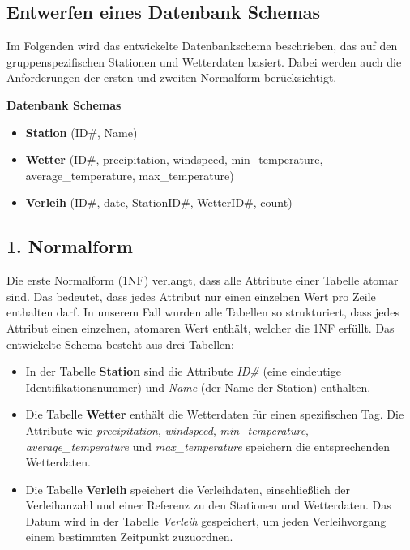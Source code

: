 \documentclass{article}
\begin{document}
\subsection{Entwerfen eines Datenbank Schemas}

Im Folgenden wird das entwickelte Datenbankschema beschrieben, das auf den gruppenspezifischen Stationen und Wetterdaten basiert. Dabei werden auch die Anforderungen der ersten und zweiten Normalform berücksichtigt.

\textbf{Datenbank Schemas}

\begin{itemize}
  \item \textbf{Station} (ID\#, Name)
  \item \textbf{Wetter} (ID\#, precipitation, windspeed, min\_temperature, average\_temperature, max\_temperature)
  \item \textbf{Verleih} (ID\#, date, StationID\#, WetterID\#, count)
\end{itemize}

\subsection*{1. Normalform}

Die erste Normalform (1NF) verlangt, dass alle Attribute einer Tabelle atomar sind. Das bedeutet, dass jedes Attribut nur einen einzelnen Wert pro Zeile enthalten darf. In unserem Fall wurden alle Tabellen so strukturiert, dass jedes Attribut einen einzelnen, atomaren Wert enthält, welcher die 1NF erfüllt.
Das entwickelte Schema besteht aus drei Tabellen:

\begin{itemize}
    \item In der Tabelle \textbf{Station} sind die Attribute \textit{ID\#} (eine eindeutige Identifikationsnummer) und \textit{Name} (der Name der Station) enthalten.
    \item Die Tabelle \textbf{Wetter} enthält die Wetterdaten für einen spezifischen Tag. Die Attribute wie \textit{precipitation}, \textit{windspeed}, \textit{min\_temperature}, \textit{average\_temperature} und \textit{max\_temperature} speichern die entsprechenden Wetterdaten.
    \item Die Tabelle \textbf{Verleih} speichert die Verleihdaten, einschließlich der Verleihanzahl und einer Referenz zu den Stationen und Wetterdaten. Das Datum wird in der Tabelle \textit{Verleih} gespeichert, um jeden Verleihvorgang einem bestimmten Zeitpunkt zuzuordnen.
\end{itemize}
\end{document}
